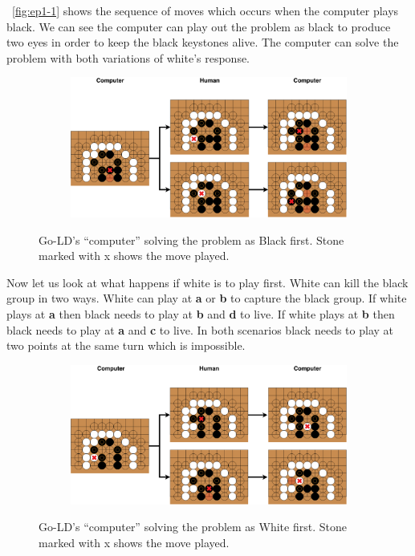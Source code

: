 \documentclass{l4proj}
\newcommand{\bo}[1]{\textbf{#1}}
\begin{document}
~\autoref{fig:ep1-1} shows the sequence of moves which occurs when the computer plays black. We can see the computer can play out the problem as black to produce two eyes in order to keep the black keystones alive. The computer can solve the problem with both variations of white’s response.

\begin{figure}[!ht]
\centering
\begin{subfigure}[b]{\textwidth}
\includegraphics[width=\textwidth]{ep1/ep1-1.pdf}
\end{subfigure}
\caption{Go-LD’s “computer” solving the problem as Black first. Stone marked with x shows the move played.}
\label{fig:ep1-1}
\end{figure}

Now let us look at what happens if white is to play first. White can kill the black group in two ways. White can play at \bo{a} or \bo{b} to capture the black group. If white plays at \bo{a} then black needs to play at \bo{b} and \bo{d} to live. If white plays at \bo{b} then black needs to play at \bo{a} and \bo{c} to live. In both scenarios black needs to play at two points at the same turn which is impossible.

\begin{figure}[!ht]
\centering
\begin{subfigure}[b]{\textwidth}
\includegraphics[width=\textwidth]{ep1/ep1-2.pdf}
\end{subfigure}
\caption{ Go-LD’s “computer” solving the problem as White first. Stone marked with x shows the move played.}
\label{fig:ep1-2}
\end{figure}
\end{document}
